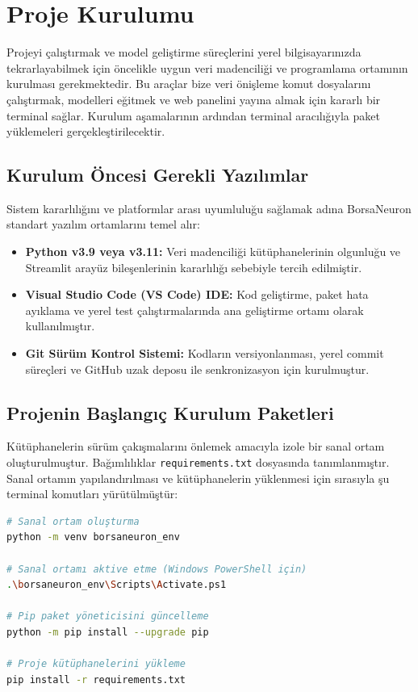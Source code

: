 \documentclass[12pt,a4paper]{report}
\begin{document}
\chapter{Proje Kurulumu}

Projeyi çalıştırmak ve model geliştirme süreçlerini yerel bilgisayarınızda tekrarlayabilmek için öncelikle uygun veri madenciliği ve programlama ortamının kurulması gerekmektedir. Bu araçlar bize veri önişleme komut dosyalarını çalıştırmak, modelleri eğitmek ve web panelini yayına almak için kararlı bir terminal sağlar. Kurulum aşamalarının ardından terminal aracılığıyla paket yüklemeleri gerçekleştirilecektir.

\section{Kurulum Öncesi Gerekli Yazılımlar}
Sistem kararlılığını ve platformlar arası uyumluluğu sağlamak adına BorsaNeuron standart yazılım ortamlarını temel alır:
\begin{itemize}
    \item \textbf{Python v3.9 veya v3.11:} Veri madenciliği kütüphanelerinin olgunluğu ve Streamlit arayüz bileşenlerinin kararlılığı sebebiyle tercih edilmiştir.
    \item \textbf{Visual Studio Code (VS Code) IDE:} Kod geliştirme, paket hata ayıklama ve yerel test çalıştırmalarında ana geliştirme ortamı olarak kullanılmıştır.
    \item \textbf{Git Sürüm Kontrol Sistemi:} Kodların versiyonlanması, yerel commit süreçleri ve GitHub uzak deposu ile senkronizasyon için kurulmuştur.
\end{itemize}

\section{Projenin Başlangıç Kurulum Paketleri}
Kütüphanelerin sürüm çakışmalarını önlemek amacıyla izole bir sanal ortam oluşturulmuştur. Bağımlılıklar \texttt{requirements.txt} dosyasında tanımlanmıştır. Sanal ortamın yapılandırılması ve kütüphanelerin yüklenmesi için sırasıyla şu terminal komutları yürütülmüştür:

\begin{lstlisting}[language=bash, caption=Sanal Ortam Kurulum Adımları]
# Sanal ortam oluşturma
python -m venv borsaneuron_env

# Sanal ortamı aktive etme (Windows PowerShell için)
.\borsaneuron_env\Scripts\Activate.ps1

# Pip paket yöneticisini güncelleme
python -m pip install --upgrade pip

# Proje kütüphanelerini yükleme
pip install -r requirements.txt
\end{lstlisting}
\end{document}
